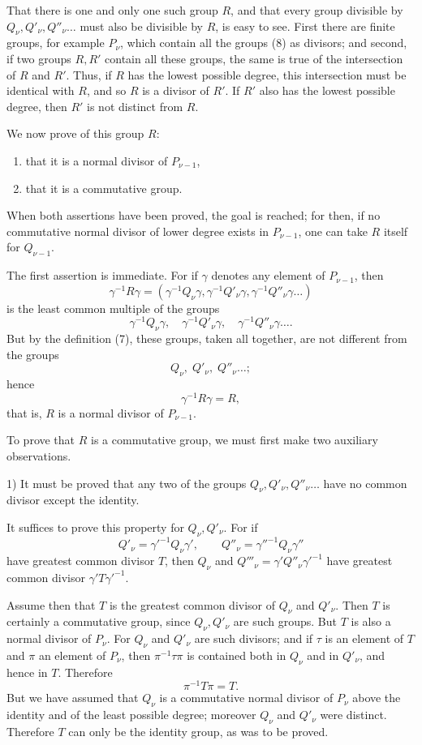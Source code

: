 \documentclass[11pt]{article}
\begin{document}
That there is one and only one such group $R$, and that every group divisible by $Q_\nu,Q'_\nu,Q''_\nu\ldots$ must also be divisible by $R$, is easy to see. First there are finite groups, for example $P_\nu$, which contain all the groups (8) as divisors; and second, if two groups $R,R'$ contain all these groups, the same is true of the intersection of $R$ and $R'$. Thus, if $R$ has the lowest possible degree, this intersection must be identical with $R$, and so $R$ is a divisor of $R'$. If $R'$ also has the lowest possible degree, then $R'$ is not distinct from $R$.

We now prove of this group $R$:
\begin{enumerate}[label=\alph*)]
\item that it is a normal divisor of $P_{\nu-1}$,
\item that it is a commutative group.
\end{enumerate}
When both assertions have been proved, the goal is reached; for then, if no commutative normal divisor of lower degree exists in $P_{\nu-1}$, one can take $R$ itself for $Q_{\nu-1}$.

The first assertion is immediate. For if $\gamma$ denotes any element of $P_{\nu-1}$, then
\[
\gamma^{-1}R\gamma=(\gamma^{-1}Q_\nu\gamma,\gamma^{-1}Q'_\nu\gamma,\gamma^{-1}Q''_\nu\gamma\ldots)
\]
is the least common multiple of the groups
\[
\gamma^{-1}Q_\nu\gamma,
\quad \gamma^{-1}Q'_\nu\gamma,
\quad \gamma^{-1}Q''_\nu\gamma\ldots.
\]
But by the definition (7), these groups, taken all together, are not different from the groups
\[
Q_\nu,\;Q'_\nu,\;Q''_\nu\ldots;
\]
hence
\[
\gamma^{-1}R\gamma=R,
\]
that is, $R$ is a normal divisor of $P_{\nu-1}$.

To prove that $R$ is a commutative group, we must first make two auxiliary observations.

1) It must be proved that any two of the groups $Q_\nu,Q'_\nu,Q''_\nu\ldots$ have no common divisor except the identity.

It suffices to prove this property for $Q_\nu,Q'_\nu$. For if
\[
Q'_\nu=\gamma'^{-1}Q_\nu\gamma',
\qquad
Q''_\nu=\gamma''^{-1}Q_\nu\gamma''
\]
have greatest common divisor $T$, then $Q_\nu$ and $Q'''_\nu=\gamma'Q''_\nu\gamma'^{-1}$ have greatest common divisor $\gamma'T\gamma'^{-1}$.

Assume then that $T$ is the greatest common divisor of $Q_\nu$ and $Q'_\nu$. Then $T$ is certainly a commutative group, since $Q_\nu,Q'_\nu$ are such groups. But $T$ is also a normal divisor of $P_\nu$. For $Q_\nu$ and $Q'_\nu$ are such divisors; and if $\tau$ is an element of $T$ and $\pi$ an element of $P_\nu$, then $\pi^{-1}\tau\pi$ is contained both in $Q_\nu$ and in $Q'_\nu$, and hence in $T$. Therefore
\[
\pi^{-1}T\pi=T.
\]
But we have assumed that $Q_\nu$ is a commutative normal divisor of $P_\nu$ above the identity and of the least possible degree; moreover $Q_\nu$ and $Q'_\nu$ were distinct. Therefore $T$ can only be the identity group, as was to be proved.
\end{document}
